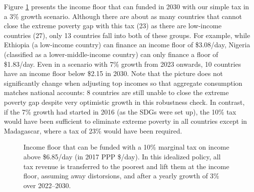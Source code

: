 Figure \ref{fig:demogrant_7__10} presents the income floor that can funded in 2030 with our simple tax in a 3\% growth scenario. Although there are about as many countries that cannot close the extreme poverty gap with this tax (23) as there are low-income countries (27), only 13 countries fall into both of these groups. %
For example, while Ethiopia (a low-income country) can finance an income floor of \$3.08/day, Nigeria (classified as a lower-middle-income country) can only finance a floor of \$1.83/day. Even in a scenario with 7\% growth from 2023 onwards, 10 countries have an income floor below \$2.15 in 2030. Note that the picture does not significantly change when adjusting top incomes so that aggregate consumption matches national accounts: 8 countries are still unable to close the extreme poverty gap despite very optimistic growth in this robustness check. In contrast, if the 7\% growth had started in 2016 (as the SDGs were set up), the 10\% tax would have been sufficient to eliminate extreme poverty in all countries except in Madagascar, where a tax of 23\% would have been required.

\begin{figure}[h]
  \caption{Income floor that can be funded with a 10\% marginal tax on income above \$6.85/day (in 2017 PPP \$/day). In this idealized policy, all tax revenue is transferred to the poorest and lift them at the income floor, assuming away distorsions, and after a yearly growth of 3\% over 2022--2030. 
  }\label{fig:demogrant_7__10}
\end{figure}

